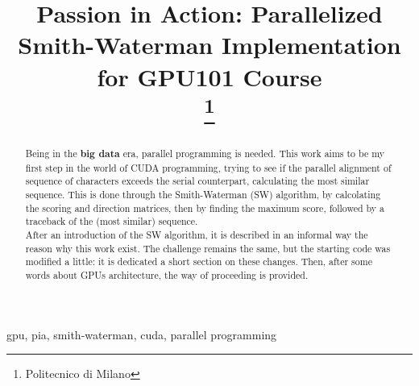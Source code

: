 \documentclass[conference]{IEEEtran}
\begin{document}
	\title{Passion in Action: Parallelized Smith-Waterman Implementation for GPU101 Course\\
		\thanks{Politecnico di Milano}
	}
	
	\author{
		
	}
	
	\maketitle
	
	\begin{abstract}
		Being in the \textbf{big data} era, parallel programming is needed. This work aims to be my first step in the world of CUDA programming, trying to see if the parallel alignment of sequence of characters exceeds the serial counterpart, calculating the most similar sequence. This is done through the Smith-Waterman (SW) algorithm, by calcolating the scoring and direction matrices, then by finding the maximum score, followed by a traceback of the (most similar) sequence.\\
		After an introduction of the SW algorithm, it is described in an informal way the reason why this work exist. The challenge remains the same, but the starting code was modified a little: it is dedicated a short section on these changes. Then, after some words about GPUs architecture, the way of proceeding is provided.
	\end{abstract}
	
	\begin{IEEEkeywords}
		gpu, pia, smith-waterman, cuda, parallel programming
	\end{IEEEkeywords}
	
\end{document}
